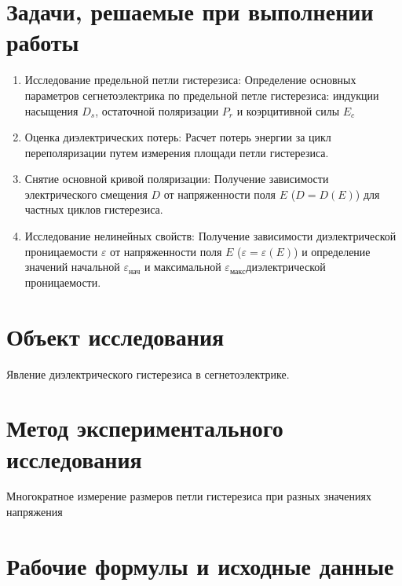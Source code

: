 \documentclass[a4paper,14pt]{article}
\begin{document}
    \section{Задачи, решаемые при выполнении работы}

    \begin{enumerate}
        \item Исследование предельной петли гистерезиса: Определение основных параметров сегнетоэлектрика по предельной петле гистерезиса: индукции насыщения $D_s$, остаточной поляризации $P_r$ и коэрцитивной силы $E_c$
        \item Оценка диэлектрических потерь: Расчет потерь энергии за цикл переполяризации путем измерения площади петли гистерезиса.
        \item Снятие основной кривой поляризации: Получение зависимости электрического смещения $D$ от напряженности поля $E$ ($D = D(E)$) для частных циклов гистерезиса.
        \item Исследование нелинейных свойств: Получение зависимости диэлектрической проницаемости $\varepsilon$ от напряженности поля $E$ ($\varepsilon = \varepsilon(E)$) и определение значений начальной $\varepsilon_{нач}$ и максимальной $\varepsilon_{макс}$диэлектрической проницаемости.
    \end{enumerate}

    \section{Объект исследования}

    Явление диэлектрического гистерезиса в сегнетоэлектрике.

    \section{Метод экспериментального исследования}

    Многократное измерение размеров петли гистерезиса при разных значениях напряжения

    \section{Рабочие формулы и исходные данные}
\end{document}
